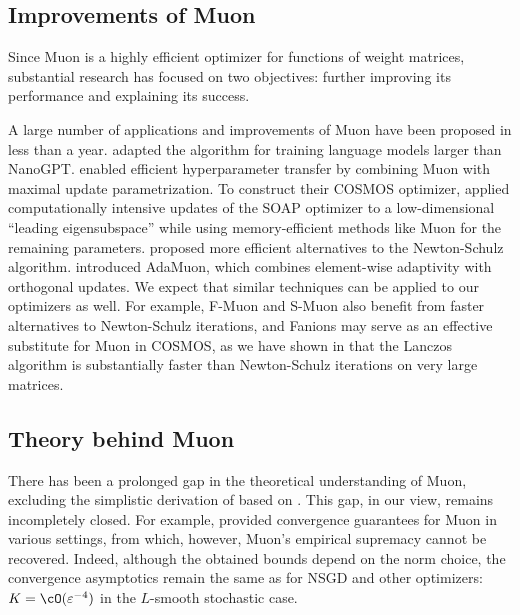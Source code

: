 \documentclass[pmlr]{jmlr}%
\renewcommand{\epsilon}{\varepsilon}
\begin{document}
 \subsection{Improvements of Muon}
 
 Since Muon \citep{jordan2024muon} is a highly efficient optimizer for functions of weight matrices, substantial research has focused on two objectives: further improving its performance and explaining its success.
 
 A large number of applications and improvements of Muon have been proposed in less than a year. \citep{liu2025muon} adapted the algorithm for training language models larger than NanoGPT. \citep{shah2025practical} enabled efficient hyperparameter transfer by combining Muon with maximal update parametrization. To construct their COSMOS optimizer, \citep{chen2025cosmoshybridadaptive} applied computationally intensive updates of the SOAP optimizer \citep{vyas2025soap} to a low-dimensional ``leading eigensubspace'' while using memory-efficient methods like Muon for the remaining parameters. \citep{amsel2025polar, grishina2025chebyshev} proposed more efficient alternatives to the Newton-Schulz algorithm. \citep{si2025adamuon} introduced AdaMuon, which combines element-wise adaptivity with orthogonal updates. We expect that similar techniques can be applied to our optimizers as well. For example, F-Muon and S-Muon also benefit from faster alternatives to Newton-Schulz iterations, and Fanions may serve as an effective substitute for Muon in COSMOS, as we have shown in  that the Lanczos algorithm is substantially faster than Newton-Schulz iterations on very large matrices.
 
 \subsection{Theory behind Muon}
 
 There has been a prolonged gap in the theoretical understanding of Muon, excluding the simplistic derivation of \citep{bernstein2025deriving} based on \citep{bernstein2024oldoptimizernewnorm}. This gap, in our view, remains incompletely closed. For example, \citep{kovalev2025understanding} provided convergence guarantees for Muon in various settings, from which, however, Muon's empirical supremacy cannot be recovered. Indeed, although the obtained bounds depend on the norm choice, the convergence asymptotics remain the same as for NSGD and other optimizers: $K = \cO(\epsilon^{-4})$ in the $L$-smooth stochastic case.
 
\end{document}
